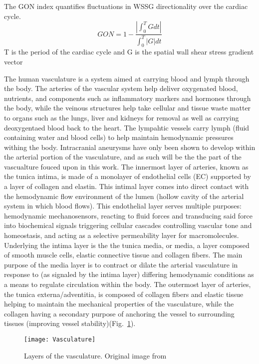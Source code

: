 The GON index \cite{Shimogonya2009} quantifies fluctuations in WSSG directionality over the cardiac cycle. 
	\begin{equation}
GON=1-\frac{|\int_{0}^{T}Gdt|}{\int_{0}^{T}| G | dt}
	\end{equation}
T is the period of the cardiac cycle and G is the spatial wall shear stress gradient vector


The human vasculature is a system aimed at carrying blood and lymph through the body. The arteries of the vascular system help deliver oxygenated blood, nutrients, and components such as inflammatory markers and hormones through the body, while the veinous structures help take cellular and tissue waste matter to organs such as the lungs, liver and kidneys for removal as well as carrying deoxygentaed blood back to the heart. The lympahtic vessels carry lymph (fluid containing water and blood cells) to help maintain hemodynamic pressures withing the body. Intracranial aneurysms have only been shown to develop within the arterial portion of the vasculature, and as such will be the the part of the vascualture fouced upon in this work. The innermost layer of arteries, known as the tunica intima, is made of a monolayer of endothelial cells (EC) supported by a layer of collagen and elastin. This intimal layer comes into direct contact with the hemodynamic flow environment of the lumen (hollow cavity of the arterial system in which blood flows). This endothelial layer serves multiple purposes: hemodynamic mechanosensors, reacting to fluid forces and transducing said force into biochemical signals triggering cellular cascades controlling vascular tone and homeostasis\cite{dorland2017cell,cancel2016endothelial,chien2007mechanotransduction}, and acting as a selective permeability layer for macromolecules\cite{benn2016ve,ghim2017visualization,mundi2018endothelial}. Underlying the intima layer is the the tunica media, or media, a layer composed of smooth muscle cells, elastic connective tissue and collagen fibers. The main purpose of the media layer is to contract or dilate the arterial vasculature in response to (as signaled by the intima layer) differing hemodynamic conditions as a means to regulate circulation within the body\cite{bogunovic2019impaired,michel2018genetics}. The outermost layer of arteries, the tunica externa/adventitia, is composed of collagen fibers and elastic tissue helping to maintain the mechanical properties of the vasculature, while the collagen having a secondary purpose of anchoring the vessel to surrounding tissues (improving vessel stability)(Fig.~\ref{Vasculature_Layers}).

\begin{figure}[!h]
  \begin{center}
    \texttt{[image: Vasculature]}
  \end{center}
  \caption{Layers of the vasculature. Original image from \cite{WIKI_Vessel}}
  \label{Vasculature_Layers}
\end{figure}